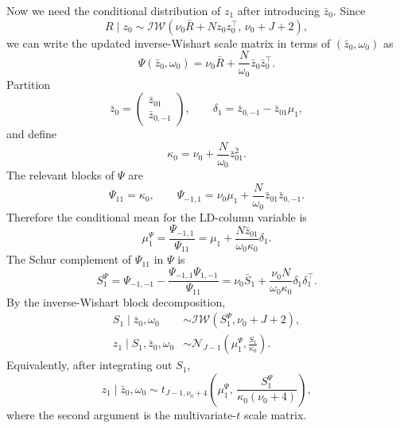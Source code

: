 \documentclass[11pt]{article}
\newcommand{\Normal}{\mathcal N}
\begin{document}
Now we need the conditional distribution of $z_1$ after introducing
$\bar z_0$. Since
\[
R\mid z_0
\sim
\mathcal{IW}\left(
\nu_0\bar R+Nz_0z_0^\top,\,
\nu_0+J+2
\right),
\]
we can write the updated inverse-Wishart scale matrix in terms of
$(\bar z_0,\omega_0)$ as
\[
\Psi(\bar z_0,\omega_0)
=
\nu_0\bar R+\frac{N}{\omega_0}\bar z_0\bar z_0^\top.
\]
Partition
\[
\bar z_0=
\begin{pmatrix}
\bar z_{01}\\ \bar z_{0,-1}
\end{pmatrix},
\qquad
\delta_1=\bar z_{0,-1}-\bar z_{01}\mu_1,
\]
and define
\[
\kappa_0
=
\nu_0+\frac{N}{\omega_0}\bar z_{01}^2.
\]
The relevant blocks of $\Psi$ are
\[
\Psi_{11}=\kappa_0,
\qquad
\Psi_{-1,1}
=
\nu_0\mu_1+\frac{N}{\omega_0}\bar z_{01}\bar z_{0,-1}.
\]
Therefore the conditional mean for the LD-column variable is
\begin{equation}\label{eq:mu-Psi-bar-z0}
\mu_1^\Psi
=
\frac{\Psi_{-1,1}}{\Psi_{11}}
=
\mu_1+\frac{N\bar z_{01}}{\omega_0\kappa_0}\delta_1.
\end{equation}
The Schur complement of $\Psi_{11}$ in $\Psi$ is
\begin{equation}\label{eq:S-Psi-bar-z0}
S_1^\Psi
=
\Psi_{-1,-1}-\frac{\Psi_{-1,1}\Psi_{1,-1}}{\Psi_{11}}
=
\nu_0\bar S_1
+\frac{\nu_0 N}{\omega_0\kappa_0}\delta_1\delta_1^\top.
\end{equation}
By the inverse-Wishart block decomposition,
\begin{align}
S_1\mid \bar z_0,\omega_0
&\sim
\mathcal{IW}\left(S_1^\Psi,\nu_0+J+2\right),
\label{eq:S1-given-bar-z0}\\
z_1\mid S_1,\bar z_0,\omega_0
&\sim
\Normal_{J-1}\left(
\mu_1^\Psi,\frac{S_1}{\kappa_0}
\right).
\label{eq:z1-given-S1-bar-z0}
\end{align}
Equivalently, after integrating out $S_1$,
\[
z_1\mid \bar z_0,\omega_0
\sim
t_{J-1,\nu_0+4}\left(
\mu_1^\Psi,\,
\frac{S_1^\Psi}{\kappa_0(\nu_0+4)}
\right),
\]
where the second argument is the multivariate-$t$ scale matrix.
\end{document}
